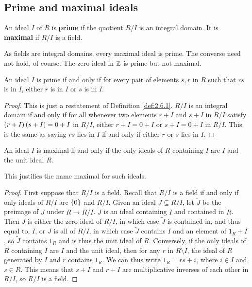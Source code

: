 
\subsection{Prime and maximal ideals}

\begin{definition}
\label{def:2.6.1}
An ideal $ I $ of $ R $ is \textbf{prime} if the quotient $ R / I $ is an integral domain. It is \textbf{maximal} if $ R / I $ is a field.
\end{definition}

\begin{note*}
As fields are integral domains, every maximal ideal is prime. The converse need not hold, of course. The zero ideal in $ \mathbb{Z} $ is prime but not maximal.
\end{note*}

\begin{lemma}
An ideal $ I $ is prime if and only if for every pair of elements $ s, r $ in $ R $ such that $ rs $ is in $ I $, either $ r $ is in $ I $ or $ s $ is in $ I $.
\end{lemma}

\begin{proof}
This is just a restatement of Definition \ref{def:2.6.1}. $ R / I $ is an integral domain if and only if for all whenever two elements $ r + I $ and $ s + I $ in $ R / I $ satisfy $ \br{r + I}\br{s + I} = 0 + I $ in $ R / I $, either $ r + I = 0 + I $ or $ s + I = 0 + I $ in $ R / I $. This is the same as saying $ rs $ lies in $ I $ if and only if either $ r $ or $ s $ lies in $ I $.
\end{proof}

\begin{lemma}
An ideal $ I $ is maximal if and only if the only ideals of $ R $ containing $ I $ are $ I $ and the unit ideal $ R $.
\end{lemma}

This justifies the name maximal for such ideals.

\begin{proof}
First suppose that $ R / I $ is a field. Recall that $ R / I $ is a field if and only if only ideals of $ R / I $ are $ \cbr{0} $ and $ R / I $. Given an ideal $ J \subseteq R / I $, let $ \widetilde{J} $ be the preimage of $ J $ under $ R \to R / I $. $ \widetilde{J} $ is an ideal containing $ I $ and contained in $ R $. Then $ J $ is either the zero ideal of $ R / I $, in which case $ \widetilde{J} $ is contained in, and thus equal to, $ I $, or $ J $ is all of $ R / I $, in which case $ \widetilde{J} $ contains $ I $ and an element of $ 1_R + I $, so $ \widetilde{J} $ contains $ 1_R $ and is thus the unit ideal of $ R $. Conversely, if the only ideals of $ R $ containing $ I $ are $ I $ and the unit ideal, then for any $ r $ in $ R \setminus I $, the ideal of $ R $ generated by $ I $ and $ r $ contains $ 1_R $. We can thus write $ 1_R = rs + i $, where $ i \in I $ and $ s \in R $. This means that $ s + I $ and $ r + I $ are multiplicative inverses of each other in $ R / I $, so $ R / I $ is a field.
\end{proof}

